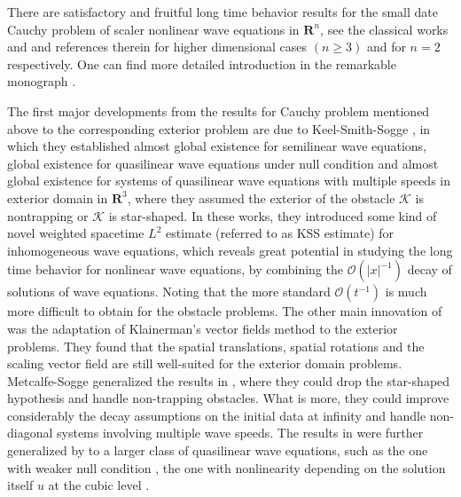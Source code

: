 \documentclass[11pt, reqno]{amsart}
\theoremstyle{definition}
\theoremstyle{remark}
\theoremstyle{definition}
\numberwithin{equation}{section}
\newcommand{\R}{\mathbf{R}}
\numberwithin{equation}{section}
\begin{document}
There are satisfactory and fruitful long time behavior results for the small date Cauchy problem of scaler nonlinear wave equations in $\R^n$, see the 
classical works \cite{Joh76, Kla80, Sha82, Kla83, Joh84, Kla85, Kla86, Chr86} and \cite{Hor85,Kov87, LiY89,Katayama,Li3,Li2,Hoshiga1,Alinhac3, Alinhac4, 
Alinhac1, Alinhac2, Hoshiga2,Hoshiga3} and references therein for higher dimensional cases $(n\ge 3)$ and for $n=2$ respectively. One can find more detailed 
introduction in the remarkable monograph \cite{LiZ17}.

The first major developments from the results for Cauchy problem mentioned above to the corresponding exterior problem are due to Keel-Smith-Sogge \cite{Keel2, 
Keel3, Keel1}, in which they established almost global existence for semilinear wave equations, global existence for quasilinear wave equations under null 
condition and almost global existence for systems of quasilinear wave equations with multiple speeds in exterior domain in $\R^3$, where they assumed the 
exterior of the obstacle $\mathcal {K}$ is nontrapping or $\mathcal {K}$ is star-shaped. In these works, they introduced some kind of novel weighted spacetime 
$L^2$ estimate (referred to as KSS estimate) for inhomogeneous wave equations, which reveals great potential in studying the long time behavior for nonlinear 
wave equations, by combining the $\mathcal {O}(|x|^{-1})$ decay of solutions of wave equations. Noting that the more standard $\mathcal {O}(t^{-1})$ is much 
more difficult to obtain for the obstacle problems. The other main innovation of \cite{Keel2, Keel3, Keel1} was the adaptation of Klainerman's vector fields 
method to the exterior problems. They found that the spatial translations, spatial rotations and the scaling vector field are still well-suited for the 
exterior domain problems. Metcalfe-Sogge \cite{Metcalfe4} generalized the results in \cite{Keel3}, where they could drop the star-shaped hypothesis and handle 
non-trapping obstacles. What is more, they could improve  considerably the decay assumptions on the initial data at infinity and handle non-diagonal systems 
involving multiple wave speeds. The results in \cite{Metcalfe4} were further generalized by \cite{Metcalfe7,MNS05, Metcalfe3} to a larger class of quasilinear 
wave equations, such as the one with weaker null condition \cite{Metcalfe7}, the one with nonlinearity depending on the solution itself $u$ at the cubic level 
\cite{MNS05}.
\end{document}
